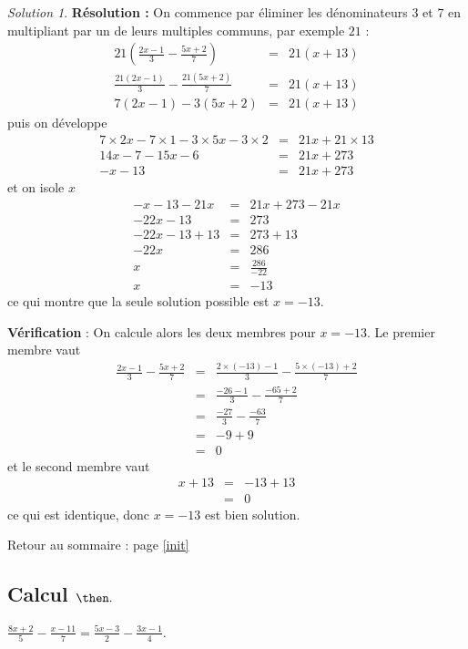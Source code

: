 \documentclass[14pt]{article}
\theoremstyle{remark}
\newtheorem*{sol}{Solution}
\newcounter{n}
\renewcommand{\it}{Retour au sommaire : page \ref{init}
	\subsection{Calcul $ \mathbf{ \then}.$}\label{\then} \stepcounter{n} }
\theoremstyle{plain}
\begin{document}
\begin{sol}
\textbf{Résolution :} On commence par éliminer les dénominateurs $3$ et $7$ en multipliant par un de leurs multiples communs, par exemple $21$ : 
\begin{eqnarray*}21\left(
\frac{2x-1}3 - \frac{5x+2}7 \right)&=&21(x +13)\\
\frac{21(2x-1)}3 - \frac{21(5x+2)}7 &=& 21(x+13)\\
7(2x-1) - 3(5x+2) &=& 21(x+13)
\end{eqnarray*} puis on développe
\begin{eqnarray*} 
7\times2x-7\times1 - 3\times 5x-3\times2 &=& 21x+21\times13\\
14x -7 - 15x - 6 &=& 21x + 273\\
-x - 13 &=& 21x + 273
\end{eqnarray*}et on isole $x$
\begin{eqnarray*}
-x - 13-21x &=& 21x + 273-21x\\
-22x - 13 &=& 273 \\
-22x-13+13 &=& 273+13\\
-22x&=& 286 \\
x &=& \frac{286}{-22}\\
x&=&-13
\end{eqnarray*}
ce qui montre que la seule solution possible est $x=-13$. 

\textbf{Vérification} : On calcule alors les deux membres pour $x=-13$. Le premier membre vaut 
\begin{eqnarray*}\frac{2x-1}3 - \frac{5x+2}7 &=&
\frac{2\times(-13)-1}3 - \frac{5\times(-13)+2}7\\
&=&
\frac{-26-1}3 - \frac{-65+2}7\\
&=&
\frac{-27}3 - \frac{-63}7\\
&=& -9 + 9 \\
&=&0
\end{eqnarray*}
et le second membre vaut 
\begin{eqnarray*}x +13&=&-13+13\\
&=&0
\end{eqnarray*} ce qui est identique, donc $x=-13$ est bien solution.
\end{sol}
\it $\frac{8x+2}5 - \frac{x-11}7 = \frac{5x-3}2 - \frac{3x-1}4$.
\end{document}

